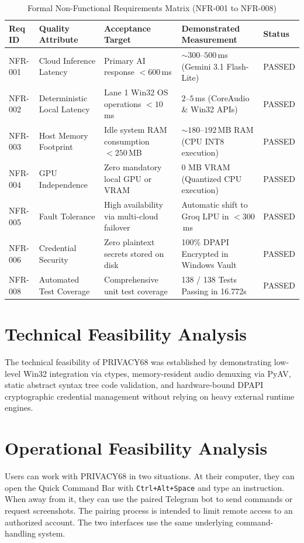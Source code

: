 \documentclass[12pt,letterpaper,oneside]{report}
\begin{document}
\begin{table}[H]
\centering
\caption{Formal Non-Functional Requirements Matrix (NFR-001 to NFR-008)}
\label{tab:nfr_matrix}
\begin{tabularx}{\textwidth}{|l|l|X|X|l|}
\hline
\textbf{Req ID} & \textbf{Quality Attribute} & \textbf{Acceptance Target} & \textbf{Demonstrated Measurement} & \textbf{Status}\\ \hline
NFR-001 & Cloud Inference Latency & Primary AI response $< 600$\,ms & $\sim 300$--$500$\,ms (Gemini 3.1 Flash-Lite) & PASSED\\ \hline
NFR-002 & Deterministic Local Latency & Lane 1 Win32 OS operations $< 10$\,ms & $2$--$5$\,ms (CoreAudio \& Win32 APIs) & PASSED\\ \hline
NFR-003 & Host Memory Footprint & Idle system RAM consumption $< 250$\,MB & $\sim 180$--$192$\,MB RAM (CPU INT8 execution) & PASSED\\ \hline
NFR-004 & GPU Independence & Zero mandatory local GPU or VRAM & 0 MB VRAM (Quantized CPU execution) & PASSED\\ \hline
NFR-005 & Fault Tolerance & High availability via multi-cloud failover & Automatic shift to Groq LPU in $< 300$\,ms & PASSED\\ \hline
NFR-006 & Credential Security & Zero plaintext secrets stored on disk & 100\% DPAPI Encrypted in Windows Vault & PASSED\\ \hline
NFR-008 & Automated Test Coverage & Comprehensive unit test coverage & 138 / 138 Tests Passing in 16.772s & PASSED\\ \hline
\end{tabularx}
\end{table}

\section{Technical Feasibility Analysis}
The technical feasibility of PRIVACY68 was established by demonstrating low-level Win32 integration via ctypes, memory-resident audio demuxing via PyAV, static abstract syntax tree code validation, and hardware-bound DPAPI cryptographic credential management without relying on heavy external runtime engines.

\section{Operational Feasibility Analysis}
Users can work with PRIVACY68 in two situations. At their computer, they can open the Quick Command Bar with \texttt{Ctrl+Alt+Space} and type an instruction. When away from it, they can use the paired Telegram bot to send commands or request screenshots. The pairing process is intended to limit remote access to an authorized account. The two interfaces use the same underlying command-handling system.
\end{document}

